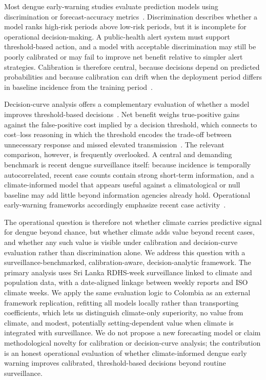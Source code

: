 \documentclass[11pt,a4paper]{article}
\begin{document}
Most dengue early-warning studies evaluate prediction models using discrimination or forecast-accuracy metrics~\cite{Johansson2019,Baharom2022,HussainAlkhateeb2021,Lowe2021}. Discrimination describes whether a model ranks high-risk periods above low-risk periods, but it is incomplete for operational decision-making. A public-health alert system must support threshold-based action, and a model with acceptable discrimination may still be poorly calibrated or may fail to improve net benefit relative to simpler alert strategies. Calibration is therefore central, because decisions depend on predicted probabilities and because calibration can drift when the deployment period differs in baseline incidence from the training period~\cite{VanCalster2019,VanCalster2023,SteyerbergVergouwe2014}.

Decision-curve analysis offers a complementary evaluation of whether a model improves threshold-based decisions~\cite{Vickers2006,Vickers2016,Vickers2019}. Net benefit weighs true-positive gains against the false-positive cost implied by a decision threshold, which connects to cost--loss reasoning in which the threshold encodes the trade-off between unnecessary response and missed elevated transmission~\cite{Murphy1985,Tozan2023}. The relevant comparison, however, is frequently overlooked. A central and demanding benchmark is recent dengue surveillance itself: because incidence is temporally autocorrelated, recent case counts contain strong short-term information, and a climate-informed model that appears useful against a climatological or null baseline may add little beyond information agencies already hold. Operational early-warning frameworks accordingly emphasize recent case activity~\cite{EWARScsd}.

The operational question is therefore not whether climate carries predictive signal for dengue beyond chance, but whether climate adds value beyond recent cases, and whether any such value is visible under calibration and decision-curve evaluation rather than discrimination alone. We address this question with a surveillance-benchmarked, calibration-aware, decision-analytic framework. The primary analysis uses Sri Lanka RDHS-week surveillance linked to climate and population data, with a date-aligned linkage between weekly reports and ISO climate weeks. We apply the same evaluation logic to Colombia as an external framework replication, refitting all models locally rather than transporting coefficients, which lets us distinguish climate-only superiority, no value from climate, and modest, potentially setting-dependent value when climate is integrated with surveillance. We do not propose a new forecasting model or claim methodological novelty for calibration or decision-curve analysis; the contribution is an honest operational evaluation of whether climate-informed dengue early warning improves calibrated, threshold-based decisions beyond routine surveillance.
\end{document}
